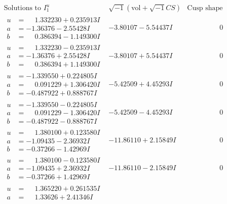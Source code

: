 \documentclass[1p]{elsarticle_modified}
\theoremstyle{definition}
\newcommand{\I}{\sqrt{-1}}
\begin{document}
$$\begin{array}{c|c|c}
\text{Solutions to }I^u_{1}& \I (\text{vol} + \sqrt{-1}CS) & \text{Cusp shape}\\
 \hline 
\begin{aligned}
u &= \phantom{-}1.332230 + 0.235913 I \\
a &= -1.36376 - 2.55428 I \\
b &= \phantom{-}0.386394 - 1.149300 I\end{aligned}
 & -3.80107 - 5.54437 I & \phantom{-0.000000 } 0 \\ \hline\begin{aligned}
u &= \phantom{-}1.332230 - 0.235913 I \\
a &= -1.36376 + 2.55428 I \\
b &= \phantom{-}0.386394 + 1.149300 I\end{aligned}
 & -3.80107 + 5.54437 I & \phantom{-0.000000 } 0 \\ \hline\begin{aligned}
u &= -1.339550 + 0.224805 I \\
a &= \phantom{-}0.091229 + 1.306420 I \\
b &= -0.487922 + 0.888767 I\end{aligned}
 & -5.42509 + 4.45293 I & \phantom{-0.000000 } 0 \\ \hline\begin{aligned}
u &= -1.339550 - 0.224805 I \\
a &= \phantom{-}0.091229 - 1.306420 I \\
b &= -0.487922 - 0.888767 I\end{aligned}
 & -5.42509 - 4.45293 I & \phantom{-0.000000 } 0 \\ \hline\begin{aligned}
u &= \phantom{-}1.380100 + 0.123580 I \\
a &= -1.09435 - 2.36932 I \\
b &= -0.37266 - 1.42969 I\end{aligned}
 & -11.86110 + 2.15849 I & \phantom{-0.000000 } 0 \\ \hline\begin{aligned}
u &= \phantom{-}1.380100 - 0.123580 I \\
a &= -1.09435 + 2.36932 I \\
b &= -0.37266 + 1.42969 I\end{aligned}
 & -11.86110 - 2.15849 I & \phantom{-0.000000 } 0 \\ \hline\begin{aligned}
u &= \phantom{-}1.365220 + 0.261535 I \\
a &= \phantom{-}1.33626 + 2.41346 I \\

\end{aligned}
\end{array}$$
\end{document}
